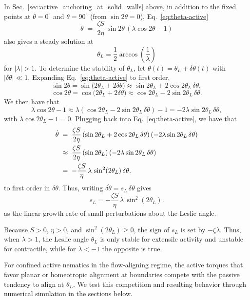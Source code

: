 \documentclass[11pt]{article}
\begin{document}
In Sec.~\ref{sec:active_anchoring_at_solid_walls} above, in addition to the fixed points at $\theta=0^\circ$ and $\theta=90^\circ$ (from $\sin 2\theta=0$), Eq.~\eqref{eq:theta-active} $$\dot{\theta} \;=\; \frac{\zeta S}{2\eta}\,\sin 2\theta\,(\lambda\cos 2\theta-1)$$ also gives a steady solution at $$\theta_L = \frac12 \arccos\!\left(\frac{1}{\lambda}\right)$$ for $|\lambda|>1$. To determine the stability of $\theta_L$, let $\theta(t)=\theta_L+\delta\theta(t)$ with
$|\delta\theta|\ll 1$. Expanding Eq.~\eqref{eq:theta-active} to first order,
$$\sin 2\theta = \sin\big(2\theta_L + 2\delta\theta\big)
\approx \sin 2\theta_L + 2\cos 2\theta_L\,\delta\theta,$$
$$\cos 2\theta = \cos\big(2\theta_L + 2\delta\theta\big) \approx \cos 2\theta_L - 2\sin 2\theta_L\,\delta\theta.$$
We then have that $$\lambda\cos 2\theta - 1 \approx \lambda(\cos 2\theta_L - 2\sin 2\theta_L\,\delta\theta) - 1
= -2\lambda\sin 2\theta_L\,\delta\theta,$$ with $\lambda\cos 2\theta_L-1=0$. Plugging back into Eq.~\eqref{eq:theta-active}, we have that 
\begin{align}
\dot{\theta} \;&=\; \frac{\zeta S}{2\eta}\,(\sin 2\theta_L + 2\cos 2\theta_L\,\delta\theta)\,(-2\lambda\sin 2\theta_L\,\delta\theta)\notag\\
\;&\approx\; \frac{\zeta S}{2\eta}\,(\sin 2\theta_L)\,(-2\lambda\sin 2\theta_L\,\delta\theta)\notag\\
\;&=\; -\frac{\zeta S}{\eta}\,\lambda\,\sin^2(2\theta_L)\,\delta\theta.
\label{eq:leslie_linearized}
\end{align} to first order in $\delta\theta$. Thus, writing $\delta\dot{\theta} = s_L\,\delta\theta$ gives
\begin{equation}
s_L = -\frac{\zeta S}{\eta}\,\lambda\,\sin^2(2\theta_L).
\label{eq:leslie_growth_rate}
\end{equation} as the linear growth rate of small perturbations about the Leslie angle. 

Because $S>0$, $\eta>0$, and $\sin^2(2\theta_L)\ge 0$, the sign of $s_L$ is set by $-\zeta\lambda$. Thus, when $\lambda>1$, the Leslie angle $\theta_L$ is only stable for extensile activity and unstable for contractile, while for $\lambda<-1$ the opposite is true.

For confined active nematics in the flow-aligning regime, the active torques that favor planar or homeotropic alignment at boundaries compete with the passive tendency to align at $\theta_L$. We test this competition and resulting behavior through numerical simulation in the sections below.
\end{document}
